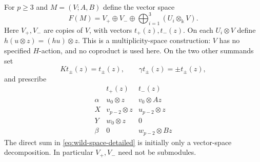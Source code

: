\documentclass[10pt,oneside]{amsart}
\newcommand{\kk}{\Bbbk}
\theoremstyle{definition}
\begin{document}
For $p\ge3$ and $M=(V;A,B)$ define the vector space
\begin{equation}\label{eq:wild-space-detailed}
 F(M)=V_+\oplus V_-\oplus\bigoplus_{i=1}^{3}(U_i\otimes_{\kk}V).
\end{equation}
Here $V_+,V_-$ are copies of $V$, with vectors $t_+(z),t_-(z)$.
On each $U_i\otimes V$ define $h(u\otimes z)=(hu)\otimes z$.
This is a multiplicity-space construction: $V$ has no specified
$H$-action, and no coproduct is used here.
On the two other summands set
\[
 Kt_\pm(z)=t_\pm(z),\qquad\gamma t_\pm(z)=\pm t_\pm(z),
\]
and prescribe
\begin{equation}\label{eq:wild-action-table}
\begin{array}{c|cc}
 &t_+(z)&t_-(z)\\\hline
 \alpha&u_0\otimes z&v_0\otimes Az\\
 X&v_{p-2}\otimes z&u_{p-2}\otimes z\\
 Y&w_0\otimes z&0\\
 \beta&0&w_{p-2}\otimes Bz
\end{array}
\end{equation}
The direct sum in \eqref{eq:wild-space-detailed} is initially only a
vector-space decomposition. In particular $V_+,V_-$ need not be submodules.
\end{document}
